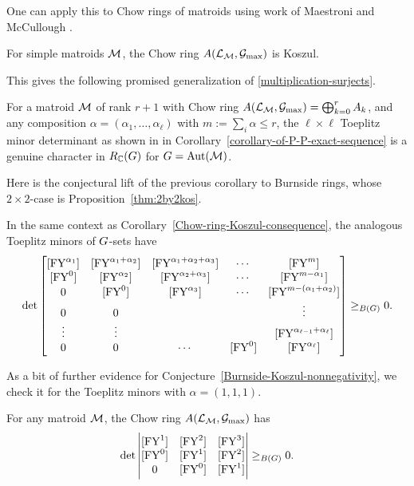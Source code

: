 One can apply this to Chow rings of
matroids using work of Maestroni and McCullough \cite{MaestroniMcCullough}.

\begin{thm} \cite{MaestroniMcCullough}
For simple matroids $\mathcal{M}$, the Chow ring $A(\mathcal{L}_{\mathcal{M}},\mathcal{G}_{\max})$ is Koszul.
\end{thm}

This gives the following promised generalization of 
\eqref{multiplication-surjects}.

\begin{cor}
\label{Chow-ring-Koszul-consequence}
For a matroid $\mathcal{M}$ of rank $r+1$ with
Chow ring $A(\mathcal{L}_{\mathcal{M}},\mathcal{G}_{\max})=\bigoplus_{k=0}^r A_k$, and any composition $\alpha=(\alpha_1,\ldots,\alpha_\ell)$ with $m:=\sum_i \alpha \leq r$, the $\ell \times \ell$ Toeplitz minor determinant as shown in
in Corollary~\ref{corollary-of-P-P-exact-sequence} is a genuine character in $R_{\mathbb{C}}(G)$ for $G=\operatorname{\mathrm{Aut}}(\mathcal{M})$.
\end{cor}

Here is the conjectural lift of the previous corollary to Burnside rings, whose $2\times 2$-case is
Proposition~\ref{thm:2by2kos}.

\begin{conj}
\label{Burnside-Koszul-nonnegativity}
In the same context as Corollary~\ref{Chow-ring-Koszul-consequence}, the analogous Toeplitz minors of $G$-sets have
$$
\det\left[
\begin{matrix}
[\FY^{\alpha_1}] & [\FY^{\alpha_1+\alpha_2}]  & [\FY^{\alpha_1+\alpha_2+\alpha_3}]  & \cdots &[\FY^m]  \\
[\FY^0] & [\FY^{\alpha_2}] & [\FY^{\alpha_2+\alpha_3}]  &\cdots  &[\FY^{m-\alpha_1}]    \\
0 & [\FY^0] & [\FY^{\alpha_3}] & \cdots & [\FY^{m-(\alpha_1+\alpha_2)}]   \\
0 & 0 &   &   & \vdots\\
\vdots & \vdots & & & [\FY^{\alpha_{\ell-1}+\alpha_\ell}]\\
0 & 0   &   \cdots     & [\FY^0] &[\FY^{\alpha_\ell}]
\end{matrix}
\right] \geq_{B(\subgroup)} 0.
$$
\end{conj}

As a bit of further evidence for Conjecture~\ref{Burnside-Koszul-nonnegativity}, we check it for the Toeplitz
minors with $\alpha=(1,1,1)$.

\begin{thm} \label{thm:3by3}
For any matroid $\mathcal{M}$, the Chow ring $A(\mathcal{L}_{\mathcal{M}},\mathcal{G}_{\max})$ has 
    \begin{align*}
    \det\left|\begin{matrix}
    [\FY^1] & [\FY^2] & [\FY^3] \\
    [\FY^0] & [\FY^1] & [\FY^2] \\
    0 & [\FY^0] & [\FY^1]
    \end{matrix}\right| \geq_{B(\subgroup)} 0.
    \end{align*}
\end{thm}

